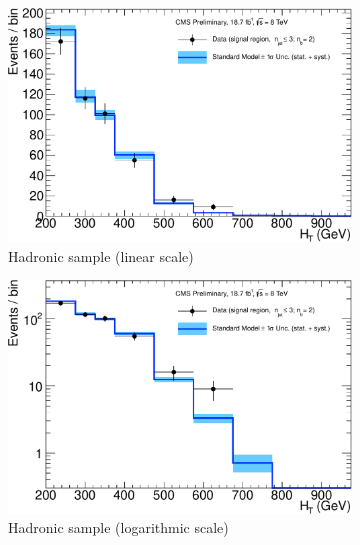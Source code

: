 \clearpage
\begin{figure}[h!]
  \centering
  \begin{subfigure}[b]{0.48\textwidth}
    \includegraphics[width=\textwidth]
    {Figs/results/v0/blueBand/single_plots/hadronic_2b_le3j.pdf}
    \caption{Hadronic sample (linear scale)}
  \end{subfigure}
  \vspace{0.7cm}\begin{subfigure}[b]{0.48\textwidth}
    \includegraphics[width=\textwidth]
    {Figs/results/v0/blueBand/single_plots/hadronic_2b_le3j_logy.pdf}
    \caption{Hadronic sample (logarithmic scale)}
  \end{subfigure}
  \begin{subfigure}[b]{0.48\textwidth}

\end{subfigure}
\end{figure}
